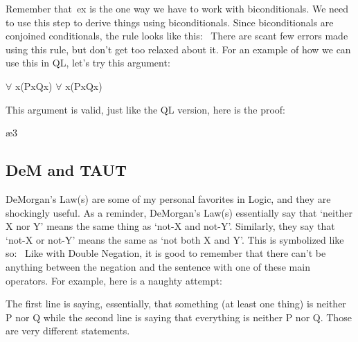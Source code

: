 Remember that \eiff ex is the one way we have to work with biconditionals. We need to use this step to derive things using biconditionals. Since biconditionals are conjoined conditionals, the rule looks like this: 
There are scant few errors made using this rule, but don't get too relaxed about it. For an example of how we can use this in QL, let's try this argument: 
\begin{center}
$\forall$ x(Px\eiff Qx) \therefore  $\forall$ x(Px\eif Qx)
\end{center}
This argument is valid, just like the QL version, here is the proof:
\begin{fitchproof}
\ae{3}
\end{fitchproof}
\subsection{DeM and TAUT}

DeMorgan's Law(s) are some of my personal favorites in Logic, and they are shockingly useful. As a reminder, DeMorgan's Law(s) essentially say that `neither X nor Y' means the same thing as `not-X and not-Y'. Similarly, they say that `not-X or not-Y' means the same as `not both X and Y'. This is symbolized like so: 
Like with Double Negation, it is good to remember that there can't be anything between the negation and the sentence with one of these main operators. For example, here is a naughty attempt: 
\begin{fitchproof}
\end{fitchproof}
The first line is saying, essentially, that something (at least one thing) is neither P nor Q while the second line is saying that everything is neither P nor Q. Those are very different statements. 

